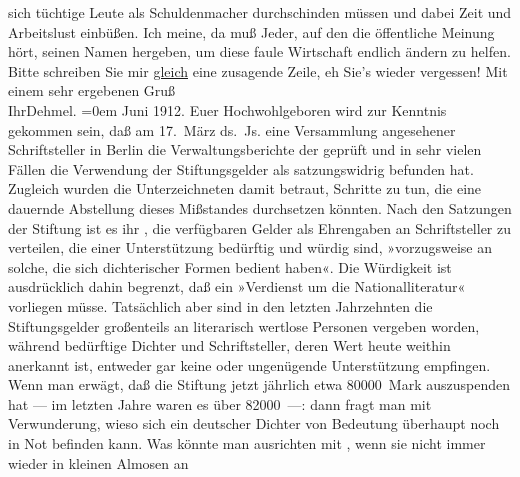 \begin{ledgroupsized}[t]{13cm}
                    sich tüchtige Leute als Schuldenmacher durchschinden müssen und dabei Zeit und
                    Arbeitslust einbüßen. Ich meine, da muß Jeder, auf den die öffentliche Meinung
                    hört, seinen Namen hergeben, um diese faule Wirtschaft endlich ändern zu helfen.
                    Bitte schreiben Sie mir \uline{gleich} eine zusagende
                    Zeile, eh Sie’s wieder vergessen! \pend
           \pstart
           Mit einem sehr ergebenen Gruß{\\[\baselineskip]}Ihr\spacefill\mbox{Dehmel.}\pend
           \leftskip=0em{}{\bigskip}\pstart
           \raggedleft{}{\pb}Juni
                        1912.\pend
           \pstart{}Euer Hochwohlgeboren\pend\pstart
           wird zur Kenntnis gekommen sein, daß am 17. März ds. Js.
                    eine Versammlung angesehener Schriftsteller in Berlin die Verwaltungsberichte der  geprüft und in
                    sehr vielen Fällen die Verwendung der Stiftungsgelder als satzungswidrig
                    befunden hat. Zugleich wurden die Unterzeichneten damit betraut, Schritte zu
                    tun, die eine dauernde Abstellung dieses Mißstandes durchsetzen könnten.\pend
           \pstart
           Nach den Satzungen der Stiftung ist es ihr ,
                    die verfügbaren Gelder als Ehrengaben an Schriftsteller zu verteilen, die einer
                    Unterstützung bedürftig und würdig sind, »vorzugsweise an solche, die sich
                    dichterischer Formen bedient haben«. Die Würdigkeit ist ausdrücklich dahin
                    begrenzt, daß ein »Verdienst um die Nationalliteratur« vorliegen müsse.
                    Tatsächlich aber sind in den letzten Jahrzehnten die Stiftungsgelder großenteils
                    an literarisch wertlose Personen vergeben worden, während bedürftige Dichter und
                    Schriftsteller, deren Wert heute weithin anerkannt ist, entweder gar keine oder
                    ungenügende Unterstützung empfingen.\pend
           \pstart
           Wenn man erwägt, daß die Stiftung jetzt jährlich etwa 80000 Mark
                    auszuspenden hat — im letzten Jahre waren es über 82000 —: dann fragt man
                    mit Verwunderung, wieso sich ein deutscher Dichter von Bedeutung überhaupt noch
                    in Not befinden kann. Was könnte man ausrichten mit , wenn sie nicht immer wieder in kleinen Almosen an

\end{ledgroupsized}
